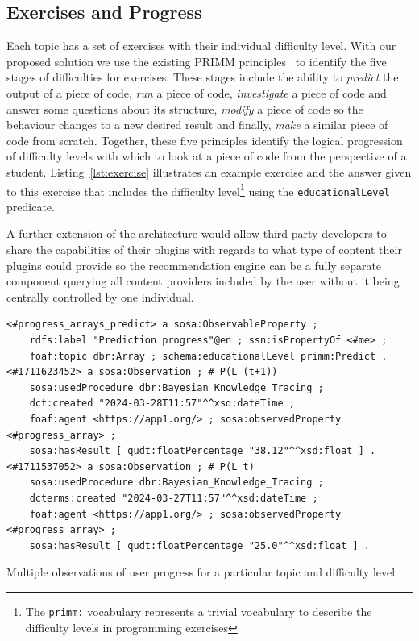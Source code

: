 \subsection{Exercises and Progress} \label{subsec:exercises}
Each topic has a set of exercises with their individual difficulty level. With our proposed solution we use the existing \mbox{PRIMM} principles~\cite{sentance2019teaching} to identify the five stages of difficulties for exercises. These stages include the ability to \textit{predict} the output of a piece of code, \textit{run} a piece of code, \textit{investigate} a piece of code and answer some questions about its structure, \textit{modify} a piece of code so the behaviour changes to a new desired result and finally, \textit{make} a similar piece of code from scratch. Together, these five principles identify the logical progression of difficulty levels with which to look at a piece of code from the perspective of a student. Listing~\ref{lst:exercise} illustrates an example exercise and the answer given to this exercise that includes the difficulty level\footnote{The \texttt{primm:} vocabulary represents a trivial vocabulary to describe the difficulty levels in programming exercises} using the \texttt{educationalLevel} predicate. 

A further extension of the architecture would allow third-party developers to share the capabilities of their plugins with regards to what type of content their plugins could provide so the recommendation engine can be a fully separate component querying all content providers included by the user without it being centrally controlled by one individual.

\begin{listing}[htb]
\begin{verbatim}
<#progress_arrays_predict> a sosa:ObservableProperty ;
    rdfs:label "Prediction progress"@en ; ssn:isPropertyOf <#me> ; 
    foaf:topic dbr:Array ; schema:educationalLevel primm:Predict .
<#1711623452> a sosa:Observation ; # P(L_(t+1))
    sosa:usedProcedure dbr:Bayesian_Knowledge_Tracing ;
    dct:created "2024-03-28T11:57"^^xsd:dateTime ;
    foaf:agent <https://app1.org/> ; sosa:observedProperty <#progress_array> ;
    sosa:hasResult [ qudt:floatPercentage "38.12"^^xsd:float ] .
<#1711537052> a sosa:Observation ; # P(L_t)
    sosa:usedProcedure dbr:Bayesian_Knowledge_Tracing ;
    dcterms:created "2024-03-27T11:57"^^xsd:dateTime ;
    foaf:agent <https://app1.org/> ; sosa:observedProperty <#progress_array> ;
    sosa:hasResult [ qudt:floatPercentage "25.0"^^xsd:float ] .
\end{verbatim}
\vspace{-4pt}
\centering
\caption{Multiple observations of user progress for a particular topic and difficulty level} \label{lst:progress}
\vspace{-2pt}
\end{listing}

